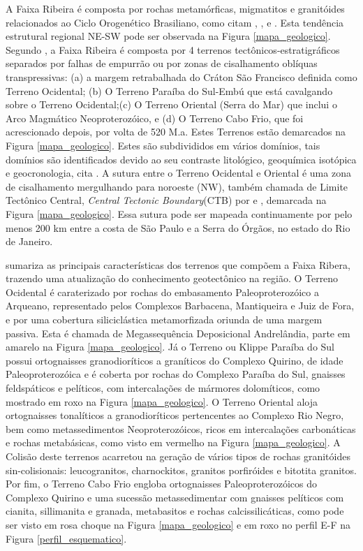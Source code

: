 A Faixa Ribeira é composta por rochas metamórficas, migmatitos e granitóides relacionados ao Ciclo Orogenético Brasiliano, como citam \cite{kuhn_metamorphic_2004}, \cite{heilbron_evolution_2010}, \cite{valeriano_u_pb_2011} e \cite{heilbron_serra_2013}. Esta tendência estrutural regional NE-SW pode ser observada na Figura \ref{mapa_geologico}. Segundo \cite{heilbron_evolution_2010}, a Faixa Ribeira é composta por 4 terrenos tectônicos-estratigráficos separados por falhas de empurrão ou por zonas de cisalhamento oblíquas transpressivas: (a) a margem retrabalhada do Cráton São Francisco definida como Terreno Ocidental; (b) O Terreno Paraíba do Sul-Embú que está cavalgando sobre o Terreno Ocidental;(c) O Terreno Oriental (Serra do Mar) que inclui o Arco Magmático Neoproterozóico, e (d) O Terreno Cabo Frio, que foi acrescionado depois, por volta de 520 M.a. Estes Terrenos estão demarcados na Figura \ref{mapa_geologico}. Estes são subdivididos em vários domínios, tais domínios são identificados devido ao seu contraste litológico, geoquímica isotópica e geocronologia, cita \cite{kuhn_metamorphic_2004}. A sutura entre o Terreno Ocidental e Oriental é uma zona de cisalhamento mergulhando para noroeste (NW), também chamada de Limite Tectônico Central, \textit{Central Tectonic Boundary}(CTB) por \cite{heilbron_evolution_2010} e \cite{trouw_new_2013}, demarcada na Figura \ref{mapa_geologico}. Essa sutura pode ser mapeada continuamente por pelo menos 200 km entre a costa de São Paulo e a Serra do Órgãos, no estado do Rio de Janeiro. 

\cite{trouw_new_2013} sumariza as principais características dos terrenos que compõem a Faixa Ribera, trazendo uma atualização do conhecimento geotectônico na região. O Terreno Ocidental é caraterizado por rochas do embasamento Paleoproterozóico a Arqueano, representado pelos Complexos Barbacena, Mantiqueira e Juiz de Fora, e por uma cobertura siliciclástica metamorfizada oriunda de uma margem passiva. Esta é chamada de Megassequência Deposicional Andrelândia, parte em amarelo na Figura \ref{mapa_geologico}. Já o Terreno ou Klippe Paraíba do Sul possui ortognaisses granodioríticos a graníticos do Complexo Quirino, de idade Paleoproterozóica e é coberta por rochas do Complexo Paraíba do Sul, gnaisses feldspáticos e pelíticos, com intercalações de mármores dolomíticos, como mostrado em roxo na Figura \ref{mapa_geologico}. O Terreno Oriental aloja ortognaisses tonalíticos a granodioríticos pertencentes ao Complexo Rio Negro, bem como metassedimentos Neoproterozóicos, ricos em intercalações carbonáticas e rochas metabásicas, como visto em vermelho na Figura \ref{mapa_geologico}. A Colisão deste terrenos acarretou na geração de vários tipos de rochas granitóides sin-colisionais: leucogranitos, charnockitos, granitos porfiróides e bitotita granitos. Por fim, o Terreno Cabo Frio engloba ortognaisses Paleoproterozóicos do Complexo Quirino e uma sucessão metassedimentar com gnaisses pelíticos com cianita, sillimanita e granada, metabasitos e rochas calcissilicáticas, como pode ser visto em rosa choque na Figura \ref{mapa_geologico} e em roxo no perfil E-F na Figura \ref{perfil_esquematico}.